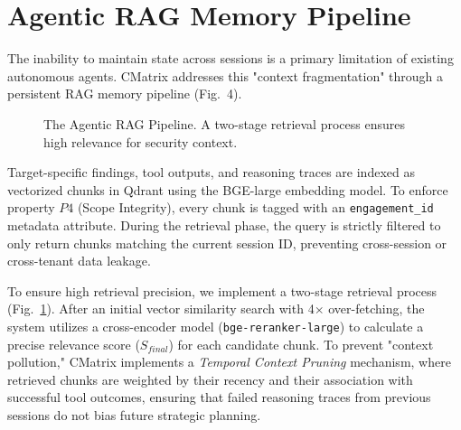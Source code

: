 \documentclass[conference,compsoc]{IEEEtran}
\begin{document}
\section{Agentic RAG Memory Pipeline} \label{sec:memory}
The inability to maintain state across sessions is a primary limitation of existing autonomous agents. CMatrix addresses this "context fragmentation" through a persistent RAG memory pipeline (Fig.~4). 

\begin{figure}[htbp]
\centering
{}
\caption{The Agentic RAG Pipeline. A two-stage retrieval process ensures high relevance for security context.}
\label{fig:rag}
\end{figure}

Target-specific findings, tool outputs, and reasoning traces are indexed as vectorized chunks in Qdrant using the BGE-large embedding model. To enforce property $P4$ (Scope Integrity), every chunk is tagged with an \texttt{engagement\_id} metadata attribute. During the retrieval phase, the query is strictly filtered to only return chunks matching the current session ID, preventing cross-session or cross-tenant data leakage.

To ensure high retrieval precision, we implement a two-stage retrieval process (Fig.~\ref{fig:rag}). After an initial vector similarity search with 4$\times$ over-fetching, the system utilizes a cross-encoder model (\texttt{bge-reranker-large}) to calculate a precise relevance score ($S_{final}$) for each candidate chunk. To prevent "context pollution," CMatrix implements a \textit{Temporal Context Pruning} mechanism, where retrieved chunks are weighted by their recency and their association with successful tool outcomes, ensuring that failed reasoning traces from previous sessions do not bias future strategic planning.
\end{document}
